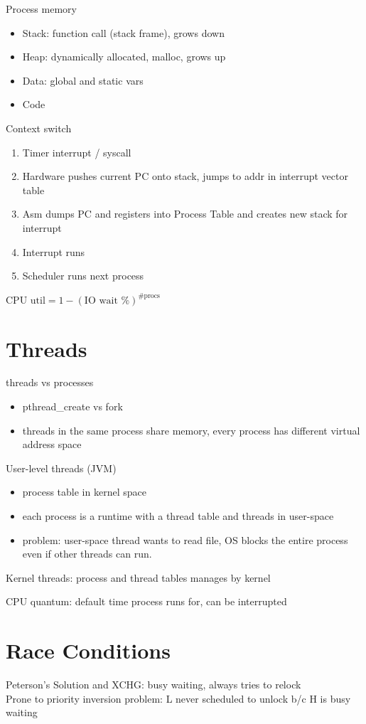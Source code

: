 \documentclass[10pt]{article}
\begin{document}
Process memory
\begin{itemize}
    \item Stack: function call (stack frame), grows down
    \item Heap: dynamically allocated, malloc, grows up
    \item Data: global and static vars
    \item Code
\end{itemize}

Context switch
\begin{enumerate}
    \item Timer interrupt / syscall
    \item Hardware pushes current PC onto stack, jumps to addr in interrupt vector table
    \item Asm dumps PC and registers into Process Table and creates new stack for interrupt
    \item Interrupt runs
    \item Scheduler runs next process
\end{enumerate}

$\text{CPU util} = 1 - (\text{IO wait \%})^{\text{\# procs}}$


\section{Threads}
threads vs processes
\begin{itemize}
    \item pthread\_create vs fork
    \item threads in the same process share memory, every process has different virtual address space
\end{itemize}

User-level threads (JVM)
\begin{itemize}
    \item process table in kernel space
    \item each process is a runtime with a thread table and threads in user-space
    \item problem: user-space thread wants to read file, OS blocks the entire process even if
        other threads can run.
\end{itemize}

Kernel threads: process and thread tables manages by kernel

CPU quantum: default time process runs for, can be interrupted


\section{Race Conditions}
Peterson's Solution and XCHG: busy waiting, always tries to relock\\
Prone to priority inversion problem: L never scheduled to unlock b/c H is busy waiting
\end{document}
